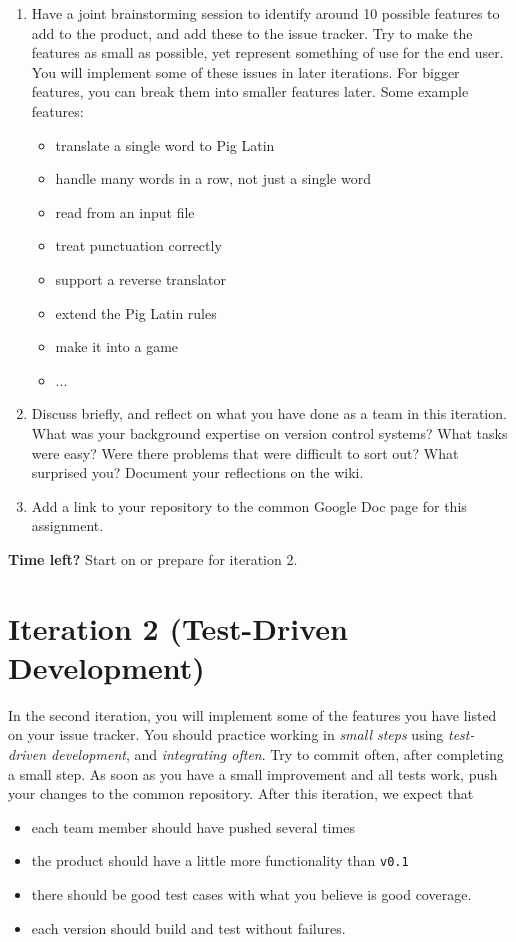\documentclass[swedish,english]{article}
\begin{document}
\begin{enumerate}
\item Have a joint brainstorming session to identify around 10 possible features to add to the product, and add these to the issue tracker. Try to make the features as small as possible, yet represent something of use for the end user. You will implement some of these issues in later iterations. For bigger features, you can break them into smaller features later. Some example features:
\begin{itemize}
\item translate a single word to Pig Latin
\item handle many words in a row, not just a single word
\item read from an input file
\item treat punctuation correctly
\item support a reverse translator
\item extend the Pig Latin rules
\item make it into a game
\item ...
\end{itemize}

\item Discuss briefly, and reflect on what you have done as a team in this iteration. What was your background expertise on version control systems? What tasks were easy? Were there problems that were difficult to sort out? What surprised you? Document your reflections on the wiki.

\item Add a link to your repository to the common Google Doc page for this assignment.
\end{enumerate}

\textbf{Time left?} Start on or prepare for iteration 2.

\newpage

\section*{Iteration 2 (Test-Driven Development)}
In the second iteration, you will implement some of the features you have listed on your issue tracker. You should practice working in \emph{small steps} using \emph{test-driven development}, and \emph{integrating often}. Try to commit often, after completing a small step. As soon as you have a small improvement and all tests work, push your changes to the common repository. After this iteration, we expect that
\begin{itemize}
\item each team member should have pushed several times
\item the product should have a little more functionality than \verb'v0.1'
\item there should be good test cases with what you believe is good coverage.
\item each version should build and test without failures.
\end{itemize}
\end{document}
